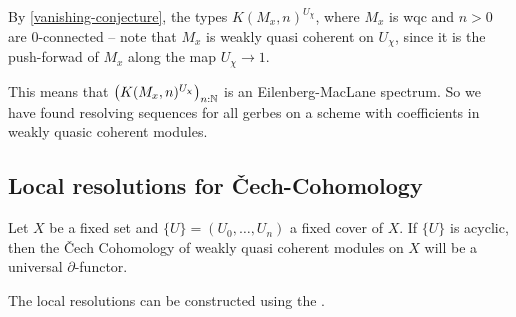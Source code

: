 By \cref{vanishing-conjecture},
the types $K(M_x,n)^{U_\chi}$, where $M_x$ is wqc and $n>0$ are $0$-connected
-- note that $M_x$ is weakly quasi coherent on $U_\chi$, since it is the push-forwad
of $M_x$ along the map $U_\chi\to 1$.

This means that $\left(K(M_x,n)^{U_\chi}\right)_{n:\mathbb{N}}$ is an Eilenberg-MacLane spectrum.
So we have found resolving sequences for all gerbes on a scheme with coefficients in weakly quasic coherent modules.


\subsection{Local resolutions for \v{C}ech-Cohomology}

Let $X$ be a fixed set and $\{U\}=(U_0,\dots,U_n)$ a fixed cover of $X$.
If $\{U\}$ is acyclic, then the \v{C}ech Cohomology of weakly quasi coherent modules on $X$
will be a universal $\partial$-functor.

The local resolutions can be constructed using the .